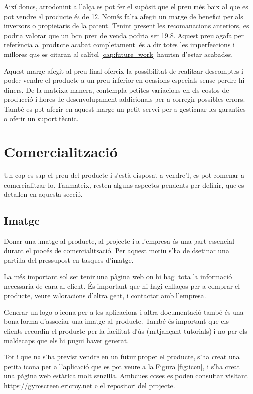 Així doncs, arrodonint a l'alça es pot fer el supòsit que el preu més baix al
que es pot vendre el producte és de
\SI[round-mode=places,round-precision=0]{12}{\EUR}. Només falta afegir un marge
de benefici per als inversors o propietaris de la patent.
Tenint present les recomanacions anteriors, es podria valorar que
un bon preu de venda podria ser
\SI{19.8}{\EUR}. Aquest preu agafa per referència al
producte acabat completament, és a dir totes les imperfeccions i millores que
es citaran al calítol \ref{cap:future_work} haurien d'estar acabades.

Aquest marge afegit al preu final ofereix la possibilitat de realitzar
descomptes i poder vendre el producte a un preu inferior en ocasions especials
sense perdre-hi diners. De la mateixa manera, contempla petites variacions en
els costos de producció i hores de desenvolupament addicionals per a corregir
possibles errors. També es pot afegir en aquest marge un petit servei per a
gestionar les garanties o oferir un suport tècnic.

\section{Comercialització}

Un cop es sap el preu del producte i s'està disposat a vendre'l, es pot
comenar a comercialitzar-lo. Tanmateix, resten alguns aspectes pendents per
definir, que es detallen en aquesta secció.

\subsection{Imatge}

Donar una imatge al producte, al projecte i a l'empresa és una part essencial
durant el procés de comercialització. Per aquest motiu s'ha de dsetinar una
partida del pressupost en tasques d'imatge.

La més important sol ser tenir una pàgina web on hi hagi tota la informació
necessaria de cara al client. És important que hi hagi enllaços per a comprar el
producte, veure valoracions d'altra gent, i contactar amb l'empresa.

Generar un logo o icona per a les aplicacions i altra documentació també és una
bona forma d'associar una imatge al producte. També és important que els clients
recordin el producte per la facilitat d'ús (mitjançant tutorials) i no per
els maldecaps que els hi pugui haver generat.

Tot i que no s'ha previst vendre en un futur proper el producte, s'ha creat una
petita icona per a l'aplicació que es pot veure a la Figura \ref{fig:icon},
i s'ha creat una pàgina web estàtica molt
senzilla. Ambdues coses es poden consultar visitant
\url{https://gyroscreen.ericroy.net} o el repositori del projecte.


